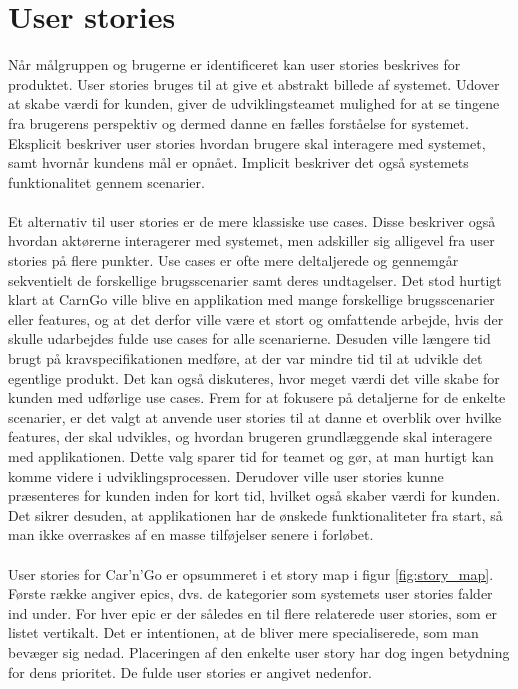 \documentclass[Kravspecifikation/Kravspec_Main.tex]{subfiles}
\begin{document}
\section{User stories}
Når målgruppen og brugerne er identificeret kan user stories beskrives for produktet. User stories bruges til at give et abstrakt billede af systemet. Udover at skabe værdi for kunden, giver de udviklingsteamet mulighed for at se tingene fra brugerens perspektiv og dermed danne en fælles forståelse for systemet. Eksplicit beskriver user stories hvordan brugere skal interagere med systemet, samt hvornår kundens mål er opnået. Implicit beskriver det også systemets funktionalitet gennem scenarier. \\\\
Et alternativ til user stories er de mere klassiske use cases. Disse beskriver også hvordan aktørerne interagerer med systemet, men adskiller sig alligevel fra user stories på flere punkter. Use cases er ofte mere deltaljerede og gennemgår sekventielt de forskellige brugsscenarier samt deres undtagelser. Det stod hurtigt klart at CarnGo ville  blive en applikation med mange forskellige brugsscenarier eller features, og at det derfor ville være et stort og omfattende arbejde, hvis der skulle udarbejdes fulde use cases for alle scenarierne. Desuden ville længere tid brugt på kravspecifikationen medføre, at der var mindre tid til at udvikle det egentlige produkt. Det kan også diskuteres, hvor meget værdi det ville skabe for kunden med udførlige use cases. Frem for at fokusere på detaljerne for de enkelte scenarier, er det valgt at anvende user stories til at danne et overblik over hvilke features, der skal udvikles, og hvordan brugeren grundlæggende skal interagere med applikationen. Dette valg sparer tid for teamet og gør, at man hurtigt kan komme videre i udviklingsprocessen. Derudover ville user stories kunne præsenteres for kunden inden for kort tid, hvilket også skaber værdi for kunden. Det sikrer desuden, at applikationen har de ønskede funktionaliteter fra start, så man ikke overraskes af en masse tilføjelser senere i forløbet.\\\\
User stories for Car'n'Go er opsummeret i et story map i figur \ref{fig:story_map}. Første række angiver epics, dvs. de kategorier som systemets user stories falder ind under. For hver epic er der således en til flere relaterede user stories, som er listet vertikalt. Det er intentionen, at de bliver mere specialiserede, som man bevæger sig nedad. Placeringen af den enkelte user story har dog ingen betydning for dens prioritet. De fulde user stories er angivet nedenfor.
\end{document}
